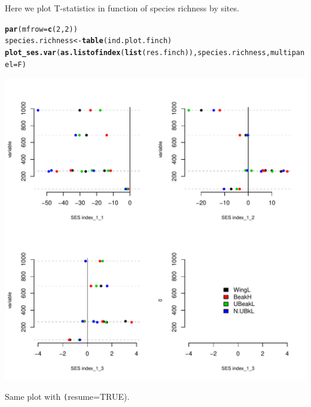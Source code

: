 \documentclass[12pt]{article}\usepackage[]{graphicx}\usepackage[]{color}
\makeatletter
\def\maxwidth{ %
  \ifdim\Gin@nat@width>\linewidth
    \linewidth
  \else
    \Gin@nat@width
  \fi
}
\newcommand{\hlnum}[1]{\textcolor[rgb]{0.686,0.059,0.569}{#1}}%
\newcommand{\hlstd}[1]{\textcolor[rgb]{0.345,0.345,0.345}{#1}}%
\newcommand{\hlkwb}[1]{\textcolor[rgb]{0.69,0.353,0.396}{#1}}%
\newcommand{\hlkwc}[1]{\textcolor[rgb]{0.333,0.667,0.333}{#1}}%
\newcommand{\hlkwd}[1]{\textcolor[rgb]{0.737,0.353,0.396}{\textbf{#1}}}%
\newenvironment{kframe}{%
 \def\at@end@of@kframe{}%
 \ifinner\ifhmode%
  \def\at@end@of@kframe{\end{minipage}}%
  \begin{minipage}{\columnwidth}%
 \fi\fi%
 \def\FrameCommand##1{\hskip\@totalleftmargin \hskip-\fboxsep
 \colorbox{shadecolor}{##1}\hskip-\fboxsep
     \hskip-\linewidth \hskip-\@totalleftmargin \hskip\columnwidth}%
 \MakeFramed {\advance\hsize-\width
   \@totalleftmargin\z@ \linewidth\hsize
   \@setminipage}}%
 {\par\unskip\endMakeFramed%
 \at@end@of@kframe}
\newenvironment{knitrout}{}{} %
\newcommand{\code}[1]{{{\tt #1}}}
\makeatother
\begin{document}
Here we plot T-statistics in function of species richness by sites.

\begin{knitrout}
\color{fgcolor}\begin{kframe}
\begin{alltt}
\hlkwd{par}\hlstd{(}\hlkwc{mfrow} \hlstd{=} \hlkwd{c}\hlstd{(}\hlnum{2}\hlstd{,} \hlnum{2}\hlstd{))}
\hlstd{species.richness} \hlkwb{<-} \hlkwd{table}\hlstd{(ind.plot.finch)}
\hlkwd{plot_ses.var}\hlstd{(}\hlkwd{as.listofindex}\hlstd{(}\hlkwd{list}\hlstd{(res.finch)), species.richness,} \hlkwc{multipanel} \hlstd{= F)}
\end{alltt}
\end{kframe}
\includegraphics[width=\maxwidth]{figure/unnamed-chunk-26} 

\end{knitrout}


Same plot with \code(resume=TRUE).
\end{document}
